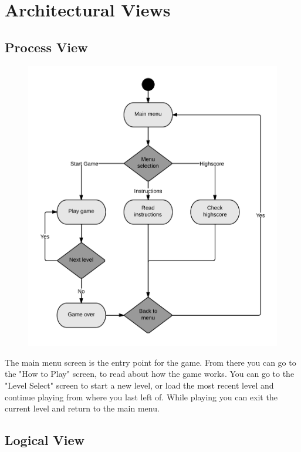 \section{Architectural Views}

\subsection*{Process View}

	\begin{figure}[H]
	\centering
	\includegraphics[width=\textwidth]{pictures/activity_diagram}
	\end{figure}

	The main menu screen is the entry point for the game. From there you can go to the "How to Play" screen, 
	to read about how the game works. You can go to the "Level Select" screen to start a new level, or load the 
	most recent level and continue playing from where you last left of. While playing you can exit the current 
	level and return to the main menu.

\subsection*{Logical View}

